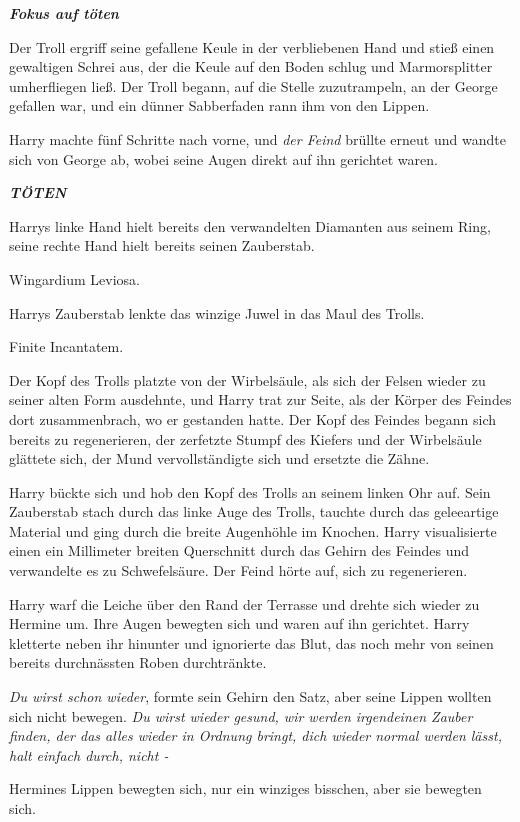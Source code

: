 \textbf{\emph{Fokus auf töten} }

Der Troll ergriff seine gefallene Keule in der verbliebenen Hand und stieß einen
gewaltigen Schrei aus, der die Keule auf den Boden schlug und Marmorsplitter
umherfliegen ließ. Der Troll begann, auf die Stelle zuzutrampeln, an der George
gefallen war, und ein dünner Sabberfaden rann ihm von den Lippen.

Harry machte fünf Schritte nach vorne, und \emph{der Feind} brüllte erneut und
wandte sich von George ab, wobei seine Augen direkt auf ihn gerichtet waren.

\textbf{\emph{TÖTEN}}

Harrys linke Hand hielt bereits den verwandelten Diamanten aus seinem Ring,
seine rechte Hand hielt bereits seinen Zauberstab.

\glqq{}Wingardium Leviosa.\grqq{}

Harrys Zauberstab lenkte das winzige Juwel in das Maul des Trolls.

\glqq{}Finite Incantatem.\grqq{}

Der Kopf des Trolls platzte von der Wirbelsäule, als sich der Felsen wieder zu
seiner alten Form ausdehnte, und Harry trat zur Seite, als der Körper des
Feindes dort zusammenbrach, wo er gestanden hatte. Der Kopf des Feindes begann
sich bereits zu regenerieren, der zerfetzte Stumpf des Kiefers und der
Wirbelsäule glättete sich, der Mund vervollständigte sich und ersetzte die
Zähne.

Harry bückte sich und hob den Kopf des Trolls an seinem linken Ohr auf. Sein
Zauberstab stach durch das linke Auge des Trolls, tauchte durch das geleeartige
Material und ging durch die breite Augenhöhle im Knochen. Harry visualisierte
einen ein Millimeter breiten Querschnitt durch das Gehirn des Feindes und
verwandelte es zu Schwefelsäure. Der Feind hörte auf, sich zu regenerieren.

Harry warf die Leiche über den Rand der Terrasse und drehte sich wieder zu
Hermine um. Ihre Augen bewegten sich und waren auf ihn gerichtet. Harry
kletterte neben ihr hinunter und ignorierte das Blut, das noch mehr von seinen
bereits durchnässten Roben durchtränkte.

\emph{Du wirst schon wieder}, formte sein Gehirn den Satz, aber seine Lippen
wollten sich nicht bewegen. \emph{Du wirst wieder gesund, wir werden irgendeinen
Zauber finden, der das alles wieder in Ordnung bringt, dich wieder normal werden
lässt, halt einfach durch, nicht -}

Hermines Lippen bewegten sich, nur ein winziges bisschen, aber sie bewegten
sich.

